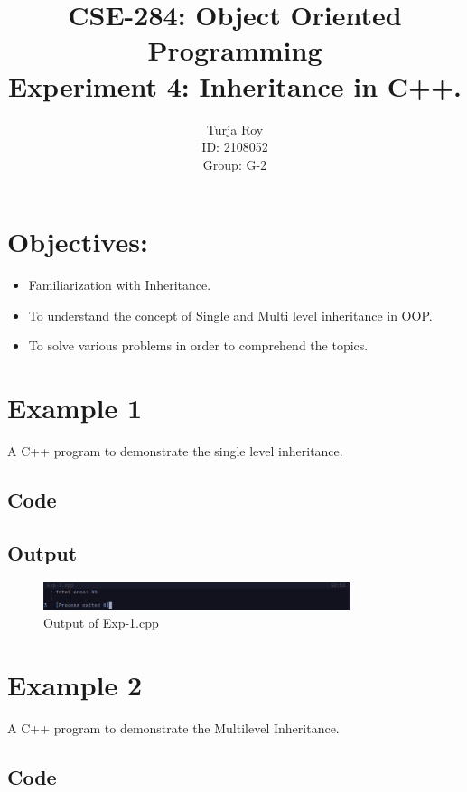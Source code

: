 \documentclass[12pt]{article}
\title{
    CSE-284: Object Oriented Programming \\
    Experiment 4: Inheritance in C++.
}
\author{
    Turja Roy \\ 
    ID: 2108052 \\ 
    Group: G-2
}
\date{}
\begin{document}
\maketitle

\section*{Objectives:}
\begin{itemize}
    \item Familiarization with Inheritance. 
    \item To understand the concept of Single and Multi level inheritance in OOP. 
    \item To solve various problems in order to comprehend the topics.
\end{itemize}


\FloatBarrier
\section*{Example 1}
A C++ program to demonstrate the single level inheritance.

\subsection*{Code}


\subsection*{Output}
\vspace{-1em}
\begin{figure}[htpb]
    \centering
    \includegraphics[width=0.8\textwidth]{Exp-1.png}
    \caption{Output of Exp-1.cpp}
\end{figure}


\FloatBarrier
\section*{Example 2}
A C++ program to demonstrate the Multilevel Inheritance.

\subsection*{Code}

\end{document}
